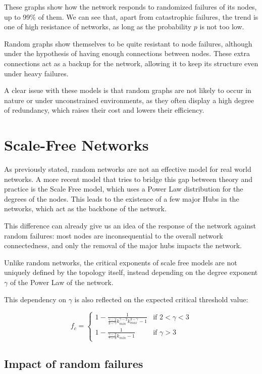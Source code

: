 \documentclass[
]{article}
\begin{document}
These graphs show how the network responds to randomized failures of its
nodes, up to 99\% of them. We can see that, apart from catastrophic
failures, the trend is one of high resistance of networks, as long as
the probability \(p\) is not too low.

Random graphs show themselves to be quite resistant to node failures,
although under the hypothesis of having enough connections between
nodes. These extra connections act as a backup for the network, allowing
it to keep its structure even under heavy failures.

A clear issue with these models is that random graphs are not likely to
occur in nature or under unconstrained environments, as they often
display a high degree of redundancy, which raises their cost and lowers
their efficiency.

\hypertarget{scale-free-networks}{%
\section{Scale-Free Networks}\label{scale-free-networks}}

As previously stated, random networks are not an effective model for
real world networks. A more recent model that tries to bridge this gap
between theory and practice is the Scale Free model, which uses a Power
Law distribution for the degrees of the nodes. This leads to the
existence of a few major Hubs in the networks, which act as the backbone
of the network.

This difference can already give us an idea of the response of the
network against random failures: most nodes are inconsequential to the
overall network connectedness, and only the removal of the major hubs
impacts the network.

Unlike random networks, the critical exponents of scale free models are
not uniquely defined by the topology itself, instead depending on the
degree exponent \(\gamma\) of the Power Law of the network.

This dependency on \(\gamma\) is also reflected on the expected critical
threshold value:

\[
f_c = \begin{cases}
   1-\frac{1}{\frac{\gamma-2}{3-\gamma}k_{min}^{\gamma-2}k_{max}^{3-\gamma}-1} &\text{if } 2 < \gamma < 3 \\
   1-\frac{1}{\frac{\gamma-2}{\gamma-3}k_{min}-1} &\text{if } \gamma > 3
\end{cases}
\]

\hypertarget{impact-of-random-failures-1}{%
\subsection{Impact of random
failures}\label{impact-of-random-failures-1}}
\end{document}
